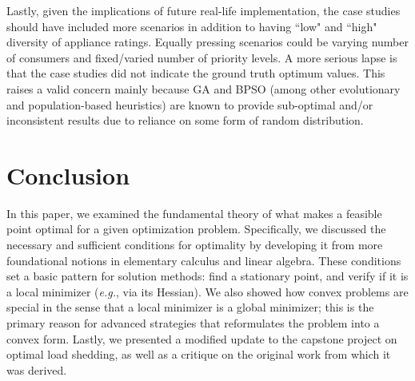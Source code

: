 \documentclass[conference, a4paper]{IEEEtran}
\begin{document}
Lastly, given the implications of future real-life implementation,
the case studies should have included more scenarios
in addition to having ``low" and ``high" diversity of appliance ratings.
Equally pressing scenarios could be varying number of consumers and fixed/varied number of priority levels.
A more serious lapse is that the case studies did not indicate the ground truth optimum values.
This raises a valid concern mainly because GA and BPSO
(among other evolutionary and population-based heuristics)
are known to provide sub-optimal and/or inconsistent results due to reliance on some form of random distribution.

\section{Conclusion}
\label{V. Conclusion}

In this paper, we examined the fundamental theory of what makes a feasible point optimal for a given optimization problem.
Specifically, we discussed the necessary and sufficient conditions for optimality by developing it
from more foundational notions in elementary calculus and linear algebra.
These conditions set a basic pattern for solution methods:
find a stationary point, and verify if it is a local minimizer (\textit{e.g.}, via its Hessian).
We also showed how convex problems are special in the sense that a local minimizer is a global minimizer;
this is the primary reason for advanced strategies that reformulates the problem into a convex form.
Lastly, we presented a modified update to the capstone project on optimal load shedding,
as well as a critique on the original work from which it was derived.





\end{document}

